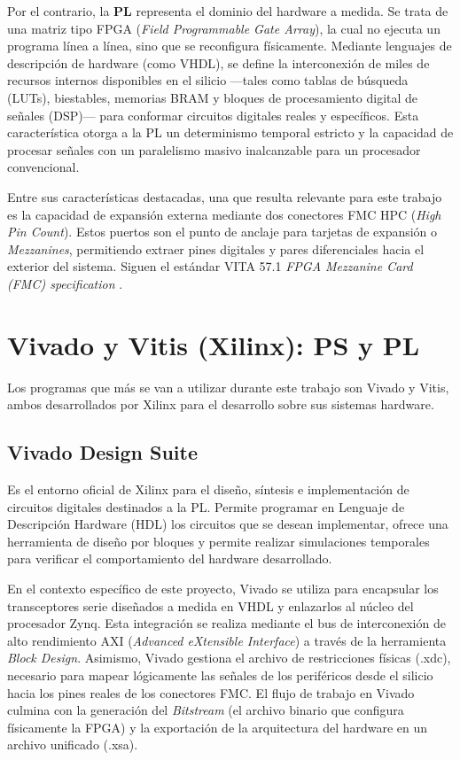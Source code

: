 Por el contrario, la \textbf{PL} representa el dominio del hardware a medida. Se trata de una matriz
tipo FPGA (\textit{Field Programmable Gate Array}), la cual no ejecuta un programa línea a línea,
sino que se reconfigura físicamente. Mediante lenguajes de descripción de hardware (como
VHDL), se define la interconexión de miles de recursos internos disponibles en el silicio
---tales como tablas de búsqueda (LUTs), biestables, memorias BRAM y bloques de
procesamiento digital de señales (DSP)--- para conformar circuitos digitales reales y
específicos. Esta característica otorga a la PL un determinismo temporal estricto y la
capacidad de procesar señales con un paralelismo masivo inalcanzable para un procesador
convencional.

Entre sus características destacadas, una que resulta relevante para este trabajo es la
capacidad de expansión externa mediante dos conectores FMC HPC (\textit{High Pin Count}). Estos
puertos son el punto de anclaje para tarjetas de expansión o \textit{Mezzanines}, permitiendo
extraer pines digitales y pares diferenciales hacia el exterior del sistema. Siguen el estándar
VITA 57.1 \textit{FPGA Mezzanine Card (FMC) specification} \cite{vita571fmc}.

\section{Vivado y Vitis (Xilinx): PS y PL}

Los programas que más se van a utilizar durante este trabajo son Vivado y Vitis, ambos
desarrollados por Xilinx para el desarrollo sobre sus sistemas hardware.

\subsection{Vivado Design Suite}

Es el entorno oficial de Xilinx para el diseño, síntesis e implementación de circuitos digitales
destinados a la PL. Permite programar en Lenguaje de Descripción Hardware (HDL) los
circuitos que se desean implementar, ofrece una herramienta de diseño por bloques y
permite realizar simulaciones temporales para verificar el comportamiento del hardware
desarrollado.

En el contexto específico de este proyecto, Vivado se utiliza para encapsular los transceptores
serie diseñados a medida en VHDL y enlazarlos al núcleo del procesador Zynq. Esta
integración se realiza mediante el bus de interconexión de alto rendimiento AXI
(\textit{Advanced eXtensible Interface}) a través de la herramienta \textit{Block Design}. Asimismo, Vivado
gestiona el archivo de restricciones físicas (.xdc), necesario para mapear lógicamente las
señales de los periféricos desde el silicio hacia los pines reales de los conectores FMC. El
flujo de trabajo en Vivado culmina con la generación del \textit{Bitstream} (el archivo binario que
configura físicamente la FPGA) y la exportación de la arquitectura del hardware en un
archivo unificado (.xsa).

